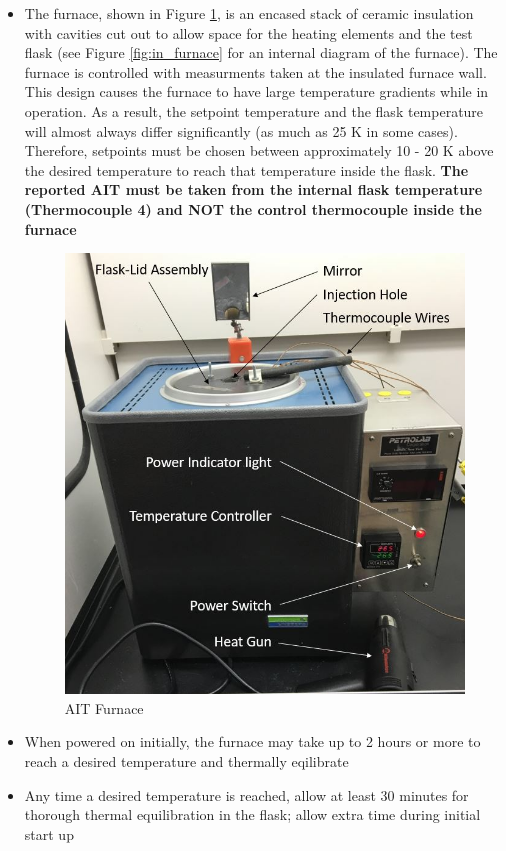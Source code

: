 \documentclass[letterpaper,11pt]{article}
\begin{document}
    \begin{itemize}
    \item The furnace, shown in Figure \ref{fig:furnace_pic}, is an encased 
        stack of ceramic insulation with cavities 
        cut out to allow space for the heating elements and the test flask
        (see Figure \ref{fig:in_furnace} for an internal diagram of the 
        furnace). The furnace is controlled with measurments taken at the 
        insulated furnace wall. This design causes the furnace to have
        large temperature gradients while in operation. As a result, the 
        setpoint temperature and the flask temperature will almost always 
        differ significantly (as much as 25 K in some cases). Therefore, 
        setpoints must be chosen between approximately 10 - 20 K above the 
        desired temperature to reach that temperature inside the flask.
        \textbf{The reported AIT must be taken from the internal flask 
        temperature (Thermocouple 4) and NOT the control thermocouple inside
        the furnace}
    
    \begin{figure}[H]
    \centering
    \includegraphics[width=.45\textwidth]{Furnace_pic_diagram.jpg}
    \caption{AIT Furnace}
    \label{fig:furnace_pic}
    \end{figure}
    
    \item When powered on initially, the furnace may take up to 2 hours or more  
        to reach a desired temperature and thermally eqilibrate
    \item Any time a desired temperature is reached, allow at least 30 
        minutes for thorough thermal equilibration in the flask; allow extra 
        time during initial start up


\end{itemize}
\end{document}
